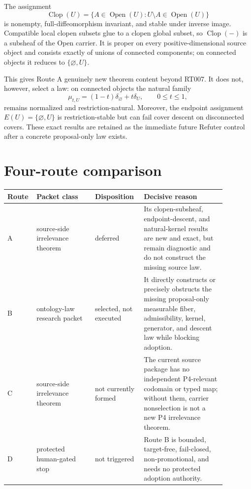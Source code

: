 \documentclass[11pt]{article}
\newcommand{\Open}{\operatorname{Open}}
\begin{document}
The assignment
\begin{equation}
 \operatorname{Clop}(U)=\{A\in\Open(U):U\setminus A\in\Open(U)\}
\end{equation}
is nonempty, full-diffeomorphism invariant, and stable under inverse image.
Compatible local clopen subsets glue to a clopen global subset, so
\(\operatorname{Clop}(-)\) is a subsheaf of the Open carrier. It is proper on
every positive-dimensional source object and consists exactly of unions of
connected components; on connected objects it reduces to
\(\{\varnothing,U\}\).

This gives Route A genuinely new theorem content beyond RT007. It does not,
however, select a law: on connected objects the natural family
\begin{equation}
 \mu_{t,U}=(1-t)\delta_{\varnothing}+t\delta_U,
 \qquad 0\leq t\leq1,
\end{equation}
remains normalized and restriction-natural. Moreover, the endpoint assignment
\(E(U)=\{\varnothing,U\}\) is restriction-stable but can fail cover descent on
disconnected covers. These exact results are retained as the immediate future
Refuter control after a concrete proposal-only law exists.

\section{Four-route comparison}

\begin{center}
\small
\begin{tabular}{>{\raggedright\arraybackslash}p{0.08\linewidth}
                >{\raggedright\arraybackslash}p{0.25\linewidth}
                >{\raggedright\arraybackslash}p{0.20\linewidth}
                >{\raggedright\arraybackslash}p{0.35\linewidth}}
\toprule
Route & Packet class & Disposition & Decisive reason\\
\midrule
A & source-side irrelevance theorem & deferred & Its clopen-subsheaf,
endpoint-descent, and natural-kernel results are new and exact, but remain
diagnostic and do not construct the missing source law.\\
B & ontology-law research packet & selected, not executed & It directly
constructs or precisely obstructs the missing proposal-only measurable fiber,
admissibility, kernel, generator, and descent law while blocking adoption.\\
C & source-side irrelevance theorem & not currently formed & The current
source package has no independent P4-relevant codomain or typed map; without
them, carrier nonselection is not a new P4 irrelevance theorem.\\
D & protected human-gated stop & not triggered & Route B is bounded,
target-free, fail-closed, non-promotional, and needs no protected adoption
authority.\\
\bottomrule
\end{tabular}
\end{center}
\end{document}
